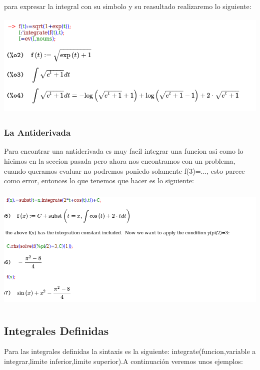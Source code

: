 \documentclass{article}
\begin{document}
para expresar la integral con su simbolo y su reasultado realizaremo lo siguiente:


\begin{center}
\includegraphics[height=5cm]{fto27.png}
\end{center}


\subsubsection{La Antiderivada}

Para encontrar una antiderivada es muy facíl integrar una funcion asi como lo hicimos en la seccion pasada pero ahora nos encontramos con un problema, cuando queramos evaluar no podremos poniedo solamente f(3)=..., esto parece como error, entonces lo que tenemos que hacer es lo siguiente:

\begin{center}
\includegraphics[height=6cm]{fto28.png}
\end{center}


\subsection{Integrales Definidas}

Para las integrales definidas la sintaxis es la siguiente:
integrate(funcion,variable a integrar,limite inferior,limite superior).A continuación veremos unos ejemplos:
\end{document}
